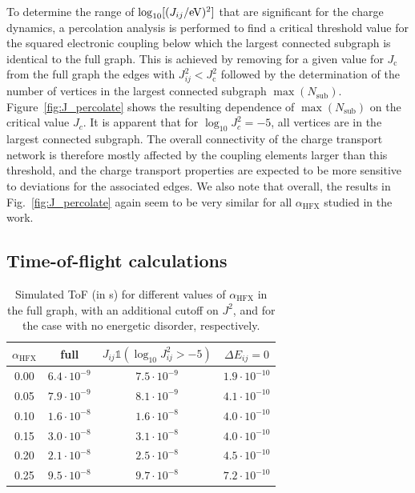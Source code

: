 \documentclass[%
 reprint,
superscriptaddress,
 amsmath,amssymb,
 aps,
prb,
floatfix
]{revtex4-2}
\newcommand{\ahfx}{\ensuremath{\alpha_\text{HFX}}\xspace}
\begin{document}
To determine the range of $\log_{10}[(J_{ij}/\unit[]{eV})^2]$ that are significant for the charge dynamics, a percolation analysis is performed to find a critical threshold value for the squared electronic coupling below which the largest connected subgraph is identical to the full graph. This is achieved by removing for a given value for $J_\text{c}$ from the full graph the edges with $J_{ij}^2 < J^2_\text{c}$ followed by the determination of the number of vertices in the largest connected subgraph $\max(N_\text{sub})$. Figure~\ref{fig:J_percolate} shows the resulting dependence of $\max({N_\text{sub}})$ on the critical value $J_c$. It is apparent that for $\log_{10} J_c^2 = -5$, all vertices are in the largest connected subgraph. The overall connectivity of the charge transport network is therefore mostly affected by the coupling elements larger than this threshold, and the charge transport properties are expected to be more sensitive to deviations for the associated edges. We also note that overall, the results in Fig.~\ref{fig:J_percolate} again seem to be very similar for all \ahfx studied in the work. 


\subsection{Time-of-flight calculations}


\begin{table}[tbp]
\caption{Simulated ToF (in \unit[]{s}) for different values of \ahfx in the full graph, with an additional cutoff on $J^2$, and for the case with no energetic disorder, respectively.}
\begin{ruledtabular}
  \begin{tabular}{c c c c }
        \ahfx & full & $J_{ij} \mathbb{1}(\log_{10} J^2_{ij} > -5)$ & $\Delta E_{ij} =0$ \\
    \hline
        0.00 &  $6.4 \cdot 10^{-9}$ & $7.5 \cdot 10^{-9}$ & $1.9 \cdot 10^{-10}$ \\
        0.05 & $ 7.9 \cdot 10^{-9}$ & $8.1 \cdot 10^{-9}$ & $4.1 \cdot 10^{-10}$ \\
        0.10 & $ 1.6 \cdot 10^{-8}$ & $1.6 \cdot 10^{-8}$ & $4.0 \cdot 10^{-10} $ \\
        0.15 & $ 3.0 \cdot 10^{-8}$ & $3.1 \cdot 10^{-8}$ & $4.0 \cdot 10^{-10} $ \\
        0.20 & $ 2.1 \cdot 10^{-8}$ & $2.5 \cdot 10^{-8}$ & $4.5 \cdot 10^{-10}$ \\
        0.25 & $ 9.5 \cdot 10^{-8}$ & $9.7 \cdot 10^{-8}$ & $7.2 \cdot 10^{-10}$ \\
    \end{tabular}
\end{ruledtabular}
\label{tab:ToF_MADN_HFX}
\end{table}
\end{document}
